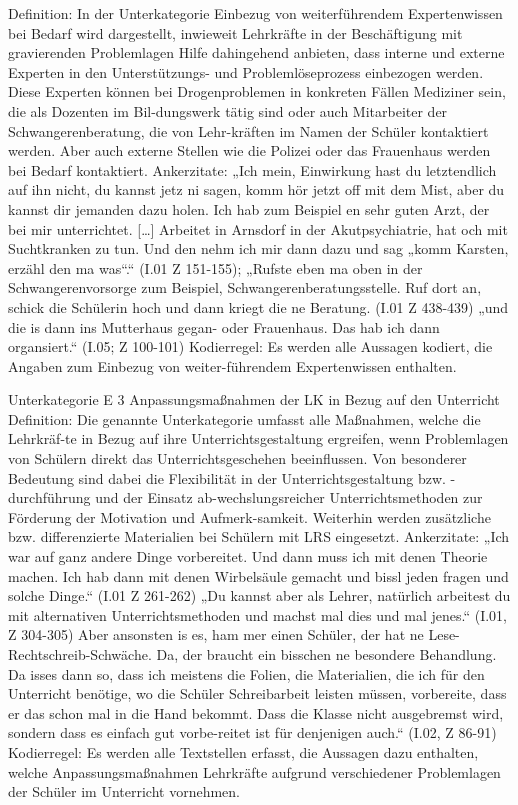 Definition: In der Unterkategorie Einbezug von weiterführendem Expertenwissen bei Bedarf wird dargestellt, inwieweit Lehrkräfte in der Beschäftigung mit gravierenden Problemlagen Hilfe dahingehend anbieten, dass interne und externe Experten in den Unterstützungs- und Problemlöseprozess einbezogen werden. Diese Experten können bei Drogenproblemen in konkreten Fällen Mediziner sein, die als Dozenten im Bil-dungswerk tätig sind oder auch Mitarbeiter der Schwangerenberatung, die von Lehr-kräften im Namen der Schüler kontaktiert werden. Aber auch externe Stellen wie die Polizei oder das Frauenhaus werden bei Bedarf kontaktiert.
Ankerzitate: „Ich mein, Einwirkung hast du letztendlich auf ihn nicht, du kannst jetz ni  sagen, komm hör jetzt off mit dem Mist, aber du kannst dir jemanden dazu holen. Ich hab zum Beispiel en sehr guten Arzt, der bei mir unterrichtet. […] Arbeitet in Arnsdorf in der Akutpsychiatrie, hat och mit Suchtkranken zu tun. Und den nehm ich mir dann dazu und sag „komm Karsten, erzähl den ma was“.“ (I.01 Z 151-155); „Rufste eben ma oben in der Schwangerenvorsorge zum Beispiel, Schwangerenberatungsstelle. Ruf dort an, schick die Schülerin hoch und dann kriegt die ne Beratung. (I.01 Z 438-439)
„und die is dann ins Mutterhaus gegan- oder Frauenhaus. Das hab ich dann organsiert.“ (I.05; Z 100-101)
Kodierregel: Es werden alle Aussagen kodiert, die Angaben zum Einbezug von weiter-führendem Expertenwissen enthalten.

Unterkategorie E 3 Anpassungsmaßnahmen der LK in Bezug auf den Unterricht
Definition: Die genannte Unterkategorie umfasst alle Maßnahmen, welche die Lehrkräf-te in Bezug auf ihre Unterrichtsgestaltung ergreifen, wenn Problemlagen von Schülern direkt das Unterrichtsgeschehen beeinflussen. Von besonderer Bedeutung sind dabei die Flexibilität in der Unterrichtsgestaltung bzw. -durchführung und der Einsatz ab-wechslungsreicher Unterrichtsmethoden zur Förderung der Motivation und Aufmerk-samkeit. Weiterhin werden zusätzliche bzw. differenzierte Materialien bei Schülern mit LRS eingesetzt. 
Ankerzitate: „Ich war auf ganz andere Dinge vorbereitet. Und dann muss ich mit denen Theorie machen. Ich hab dann mit denen Wirbelsäule gemacht und bissl jeden fragen und solche Dinge.“ (I.01 Z 261-262)
„Du kannst aber als Lehrer, natürlich arbeitest du mit alternativen Unterrichtsmethoden und machst mal dies und mal jenes.“ (I.01, Z 304-305)
Aber ansonsten is es, ham mer einen Schüler, der hat ne Lese-Rechtschreib-Schwäche. Da, der braucht ein bisschen ne besondere Behandlung. Da isses dann so, dass ich meistens die Folien, die Materialien, die ich für den Unterricht benötige, wo die Schüler Schreibarbeit leisten müssen, vorbereite, dass er das schon mal in die Hand bekommt. Dass die Klasse nicht ausgebremst wird, sondern dass es einfach gut vorbe-reitet ist für denjenigen auch.“ (I.02, Z 86-91)
Kodierregel: Es werden alle Textstellen erfasst, die Aussagen dazu enthalten, welche Anpassungsmaßnahmen Lehrkräfte aufgrund verschiedener Problemlagen der Schüler im Unterricht vornehmen. 

